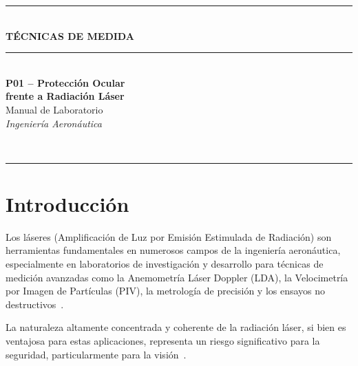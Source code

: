 \documentclass[12pt,a4paper]{article}
\begin{document}
\begin{titlepage}
	\centering
	\vspace*{1cm}
	{\color{aeroblue}\rule{\linewidth}{2pt}}\\[0.4cm]
	{\Large\bfseries\color{aeroblue} TÉCNICAS DE MEDIDA}\\[0.3cm]
	{\color{aeroblue}\rule{\linewidth}{1pt}}\\[1.5cm]
	{\huge\bfseries P01 -- Protección Ocular\\[0.3cm]
	frente a Radiación Láser}\\[1cm]
	{\large Manual de Laboratorio}\\[0.5cm]
	{\large\itshape Ingeniería Aeronáutica}\\[2cm]
	\\[2.5cm]
	{\color{aeroblue}\rule{\linewidth}{1pt}}
\end{titlepage}

\tableofcontents
\newpage

\section{Introducción}
\label{sec:intro}

Los láseres (Amplificación de Luz por Emisión Estimulada de Radiación) son
herramientas fundamentales en numerosos campos de la ingeniería aeronáutica,
especialmente en laboratorios de investigación y desarrollo para técnicas de
medición avanzadas como la Anemometría Láser Doppler (LDA), la Velocimetría
por Imagen de Partículas (PIV), la metrología de precisión y los ensayos no
destructivos~\cite{svelto2010}.

La naturaleza altamente concentrada y coherente de la radiación láser, si bien
es ventajosa para estas aplicaciones, representa un riesgo significativo para la
seguridad, particularmente para la visión~\cite{henderson2004}.
\end{document}
